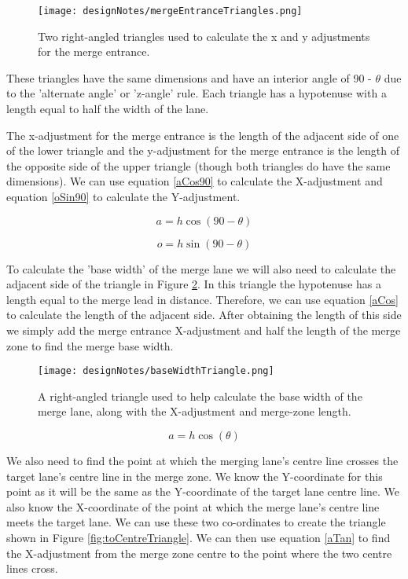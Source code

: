 \begin{figure}[htb]
\texttt{[image: designNotes/mergeEntranceTriangles.png]}
\caption{Two right-angled triangles used to calculate the x and y adjustments for the merge entrance.}
\label{fig:mergeEntranceTriangles}
\end{figure}

These triangles have the same dimensions and have an interior angle of 90 - $\theta$ due to the 'alternate angle' or 'z-angle' rule. Each triangle has a hypotenuse with a length equal to half the width of the lane. 

The x-adjustment for the merge entrance is the length of the adjacent side of one of the lower triangle and the y-adjustment for the merge entrance is the length of the opposite side of the upper triangle (though both triangles do have the same dimensions). We can use equation \ref{aCos90} to calculate the X-adjustment and equation \ref{oSin90} to calculate the Y-adjustment.

\begin{equation}\label{aCos90}
a = h \cos(90 - \theta)
\end{equation}{}

\begin{equation}\label{oSin90}
o = h \sin(90 - \theta)
\end{equation}

To calculate the 'base width' of the merge lane we will also need to calculate the adjacent side of the triangle in Figure \ref{fig:baseWidthTriangle}. In this triangle the hypotenuse has a length equal to the merge lead in distance. Therefore, we can use equation \ref{aCos} to calculate the length of the adjacent side. After obtaining the length of this side we simply add the merge entrance X-adjustment and half the length of the merge zone to find the merge base width.

\begin{figure}[htb]
\texttt{[image: designNotes/baseWidthTriangle.png]}
\caption{A right-angled triangle used to help calculate the base width of the merge lane, along with the X-adjustment and merge-zone length.}
\label{fig:baseWidthTriangle}
\end{figure}

\begin{equation}\label{aCos}
a = h \cos(\theta)
\end{equation}

We also need to find the point at which the merging lane's centre line crosses the target lane's centre line in the merge zone. We know the Y-coordinate for this point as it will be the same as the Y-coordinate of the target lane centre line. We also know the X-coordinate of the point at which the merge lane's centre line meets the target lane. We can use these two co-ordinates to create the triangle shown in Figure \ref{fig:toCentreTriangle}. We can then use equation \ref{aTan} to find the X-adjustment from the merge zone centre to the point where the two centre lines cross.

